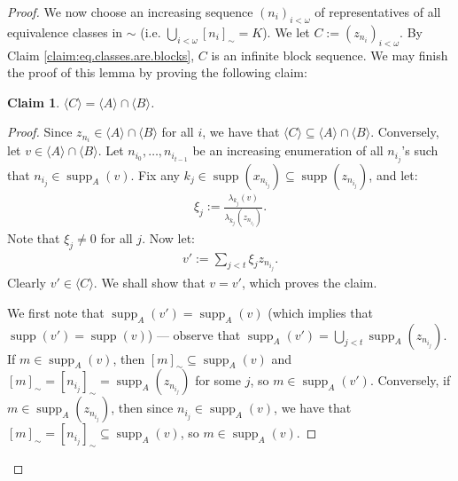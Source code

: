 \documentclass[11pt,reqno]{amsart}
\theoremstyle{plain}
\numberwithin{equation}{section}
\newtheorem{claim}{Claim}
\theoremstyle{definition}
\newcommand{\func}{\operatorname}
\renewcommand{\c}[1]{\langle #1 \rangle}
\newcommand{\supp}{\func{supp}}
\newenvironment{midproof}[1][Proof]
  {\begin{proof}[#1]\renewcommand{\qedsymbol}{$\blacksquare$}}
  {\end{proof}}
\begin{document}
\begin{proof}
    We now choose an increasing sequence $(n_i)_{i<\omega}$ of representatives of all equivalence classes in $\sim$ (i.e. $\bigcup_{i<\omega} [n_i]_\sim = K$). We let $C := (z_{n_i})_{i<\omega}$. By Claim \ref{claim:eq.classes.are.blocks}, $C$ is an infinite block sequence. We may finish the proof of this lemma by proving the following claim:

    \begin{claim}
        $\c{C} = \c{A} \cap \c{B}$.
    \end{claim}

    \begin{midproof}
        Since $z_{n_i} \in \c{A} \cap \c{B}$ for all $i$, we have that $\c{C} \subseteq \c{A} \cap \c{B}$. Conversely, let $v \in \c{A} \cap \c{B}$. Let $n_{i_0},\dots,n_{i_{t-1}}$ be an increasing enumeration of all $n_{i_j}$'s such that $n_{i_j} \in \supp_A(v)$. Fix any $k_j \in \supp(x_{n_{i_j}}) \subseteq \supp(z_{n_{i_j}})$, and let:
        \begin{align*}
            \xi_j := \frac{\lambda_{k_j}(v)}{\lambda_{k_j}(z_{n_{i_j}})}.
        \end{align*}
        Note that $\xi_j \neq 0$ for all $j$. Now let:
        \begin{align*}
            v' := \sum_{j<t} \xi_jz_{n_{i_j}}.
        \end{align*}
        Clearly $v' \in \c{C}$. We shall show that $v = v'$, which proves the claim.

        We first note that $\supp_A(v') = \supp_A(v)$ (which implies that $\supp(v') = \supp(v)$) --- observe that $\supp_A(v') = \bigcup_{j<t} \supp_A(z_{n_{i_j}})$. If $m \in \supp_A(v)$, then $[m]_\sim \subseteq \supp_A(v)$ and $[m]_\sim = [n_{i_j}]_\sim = \supp_A(z_{n_{i_j}})$ for some $j$, so $m \in \supp_A(v')$. Conversely, if $m \in \supp_A(z_{n_{i_j}})$, then since $n_{i_j} \in \supp_A(v)$, we have that $[m]_\sim = [n_{i_j}]_\sim \subseteq \supp_A(v)$, so $m \in \supp_A(v)$. 


\end{midproof}
\end{proof}
\end{document}
